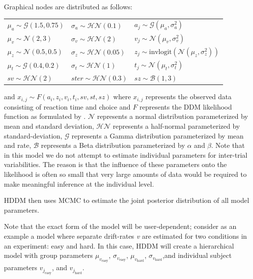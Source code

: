 \documentclass[letterpaper,10pt,english]{article}
\begin{document}
Graphical nodes are distributed as follows:\\
\begin{center}
\begin{tabular}{l|l|l}
$\mu_{a} \sim \mathcal{G}(1.5, 0.75)$ & $\sigma_{a} \sim
\mathcal{HN}(0.1)$ & $a_{j} \sim \mathcal{G}(\mu_{a}, \sigma_{a}^2)$
\\
$\mu_{v} \sim \mathcal{N}(2, 3)$ & $\sigma_{v} \sim \mathcal{HN}(2)$ &
$v_{j} \sim \mathcal{N}(\mu_{v}, \sigma_{v}^2)$ \\

$\mu_{z} \sim \mathcal{N}(0.5, 0.5)$ & $\sigma_{z} \sim
\mathcal{HN}(0.05)$ & $z_{j} \sim \text{invlogit}(\mathcal{N}(\mu_{z},
\sigma_{z}^2))$ \\

$\mu_{t} \sim \mathcal{G}(0.4, 0.2)$ & $\sigma_{t} \sim
\mathcal{HN}(1)$ & $t_{j} \sim \mathcal{N}(\mu_{t}, \sigma_{t}^2)$\\

$sv \sim \mathcal{HN}(2)$ & $ster \sim \mathcal{HN}(0.3)$ & $sz \sim
\mathcal{B}(1, 3)$
\end{tabular}
\end{center}
and $x_{i, j} \sim F(a_{i}, z_{i}, v_{i}, t_{i}, sv, st, sz)$ where
$x_{i, j}$ represents the observed data consisting of
reaction time and choice and $F$ represents the DDM likelihood
function as formulated by \citep{NavarroFuss09}. $\mathcal{N}$
represents a normal distribution parameterized by mean and standard
deviation, $\mathcal{HN}$ represents a half-normal parameterized by
standard-deviation, $\mathcal{G}$ represents a Gamma
distribution parameterized by mean and rate, $\mathcal{B}$
represents a Beta distribution parameterized by $\alpha$ and
$\beta$. Note that in this model we do not attempt to estimate
individual parameters for inter-trial variabilities. The reason is
that the influence of these parameters onto the likelihood is often so
small that very large amounts of data would be required to make
meaningful inference at the individual level.

HDDM then uses MCMC to estimate the joint posterior distribution of
all model parameters.

Note that the exact form of the model will be user-dependent; consider
as an example a model where separate drift-rates \emph{v} are
estimated for two conditions in an experiment: easy and hard. In this
case, HDDM will create a hierarchical model with group parameters
$\mu_{v_{\text{easy}}}$, $\sigma_{v_{\text{easy}}}$,
$\mu_{v_{\text{hard}}}$, $\sigma_{v_{\text{hard}}}$,and individual
subject parameters $v_{j_{\text{easy}}}$, and $v_{j_{\text{hard}}}$.
\end{document}
